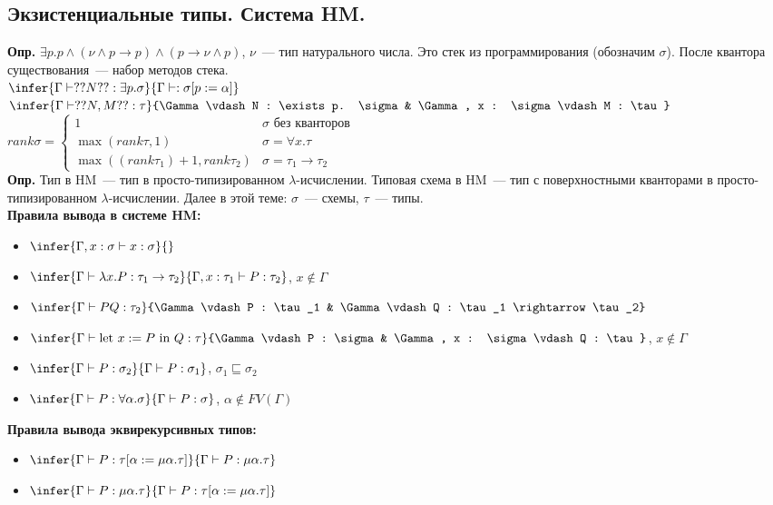 \documentclass{article}
\begin{document}
	\subsection{Экзистенциальные типы. Система HM.}
	\textbf{Опр.} $\exists p. p \wedge (\nu \wedge p \rightarrow p) \wedge (p \rightarrow \nu \wedge p)$, $\nu$~--- тип натурального числа. Это стек из программирования (обозначим $\sigma$). После квантора существования~--- набор методов стека. \\
	$\infer{\Gamma \vdash ?? N ?? : \exists p. \sigma}{\Gamma \vdash : \sigma [p := \alpha]}$ \\
	$\infer{\Gamma \vdash ?? N, M ??: \tau}{\Gamma \vdash N : \exists p. \sigma & \Gamma, x : \sigma \vdash M : \tau}$ \\
	$rank \sigma =
	\begin{cases}
		1 & \sigma \text{ без кванторов} \\
		\max(rank \tau, 1) & \sigma = \forall x. \tau \\
		\max((rank \tau_1) + 1, rank \tau_2) & \sigma = \tau_1 \rightarrow \tau_2
	\end{cases}
	$ \\
	\textbf{Опр.} Тип в HM~--- тип в просто-типизированном $\lambda$-исчислении. Типовая схема в HM~--- тип с поверхностными кванторами в просто-типизированном $\lambda$-исчислении. Далее в этой теме: $\sigma$~--- схемы, $\tau$~--- типы. \\
	\textbf{Правила вывода в системе HM:}
	\begin{itemize}
		\item $\infer{\Gamma, x : \sigma \vdash x : \sigma}{}$
		\item $\infer{\Gamma \vdash \lambda x. P : \tau_1 \rightarrow \tau_2}{\Gamma, x : \tau_1 \vdash P : \tau_2}$, $x \not\in \Gamma$
		\item $\infer{\Gamma \vdash PQ : \tau_2}{\Gamma \vdash P : \tau_1 & \Gamma \vdash Q : \tau_1 \rightarrow \tau_2}$
		\item $\infer{\Gamma \vdash \text{let } x := P \text{ in } Q : \tau}{\Gamma \vdash P : \sigma & \Gamma, x : \sigma \vdash Q : \tau}$, $x \not\in \Gamma$
		\item $\infer{\Gamma \vdash P : \sigma_2}{\Gamma \vdash P : \sigma_1}$, $\sigma_1 \sqsubseteq \sigma_2$
		\item $\infer{\Gamma \vdash P : \forall \alpha. \sigma}{\Gamma \vdash P : \sigma}$, $\alpha \not\in FV(\Gamma)$
	\end{itemize}
	\textbf{Правила вывода эквирекурсивных типов:}
	\begin{itemize}
		\item $\infer{\Gamma \vdash P : \tau [\alpha := \mu \alpha. \tau]}{\Gamma \vdash P : \mu \alpha. \tau}$
		\item $\infer{\Gamma \vdash P : \mu \alpha. \tau}{\Gamma \vdash P : \tau [\alpha := \mu \alpha. \tau]}$
	\end{itemize}
\end{document}
